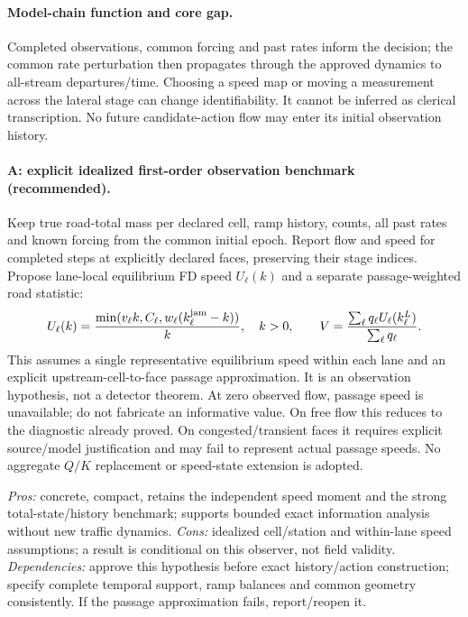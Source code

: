 \documentclass[10pt,a4paper]{article}
\begin{document}
\paragraph{Model-chain function and core gap.}
Completed observations, common forcing and past rates inform the decision;
the common rate perturbation then propagates through the approved dynamics
to all-stream departures/time. Choosing a speed map or moving a measurement
across the lateral stage can change identifiability. It cannot be inferred
as clerical transcription. No future candidate-action flow may enter its
initial observation history.

\paragraph{A: explicit idealized first-order observation benchmark (recommended).}
Keep true road-total mass per declared cell, ramp history, counts, all past
rates and known forcing from the common initial epoch. Report flow and speed
for completed steps at explicitly declared faces, preserving their stage
indices. Propose lane-local equilibrium FD speed $U_\ell(k)$ and a separate
passage-weighted road statistic:
\begin{equation}
U_\ell(k)=\frac{\min(v_\ell k,C_\ell,w_\ell(k_\ell^{\rm jam}-k))}{k},
\quad k>0,\qquad
V=\frac{\sum_\ell q_\ell U_\ell(k_\ell^L)}{\sum_\ell q_\ell}.
\end{equation}
This assumes a single representative equilibrium speed within each lane and
an explicit upstream-cell-to-face passage approximation. It is an observation
hypothesis, not a detector theorem. At zero observed flow, passage speed is
unavailable; do not fabricate an informative value. On free flow this reduces
to the diagnostic already proved. On congested/transient faces it requires
explicit source/model justification and may fail to represent actual passage
speeds. No aggregate $Q/K$ replacement or speed-state extension is adopted.

\emph{Pros:} concrete, compact, retains the independent speed moment and the
strong total-state/history benchmark; supports bounded exact information
analysis without new traffic dynamics.
\emph{Cons:} idealized cell/station and within-lane speed assumptions; a result
is conditional on this observer, not field validity.
\emph{Dependencies:} approve this hypothesis before exact history/action
construction; specify complete temporal support, ramp balances and common
geometry consistently. If the passage approximation fails, report/reopen it.
\end{document}
